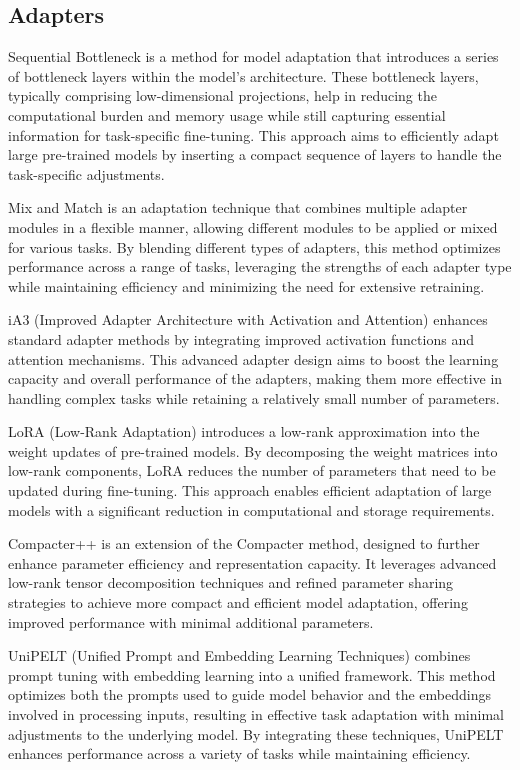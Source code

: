 \documentclass[10pt,twocolumn,letterpaper]{article}
\begin{document}
\subsection{Adapters}
Sequential Bottleneck is a method for model adaptation that introduces a series of bottleneck layers within the model’s architecture. These bottleneck layers, typically comprising low-dimensional projections, help in reducing the computational burden and memory usage while still capturing essential information for task-specific fine-tuning. This approach aims to efficiently adapt large pre-trained models by inserting a compact sequence of layers to handle the task-specific adjustments.

Mix and Match is an adaptation technique that combines multiple adapter modules in a flexible manner, allowing different modules to be applied or mixed for various tasks. By blending different types of adapters, this method optimizes performance across a range of tasks, leveraging the strengths of each adapter type while maintaining efficiency and minimizing the need for extensive retraining.

iA3 (Improved Adapter Architecture with Activation and Attention) enhances standard adapter methods by integrating improved activation functions and attention mechanisms. This advanced adapter design aims to boost the learning capacity and overall performance of the adapters, making them more effective in handling complex tasks while retaining a relatively small number of parameters.

LoRA (Low-Rank Adaptation) introduces a low-rank approximation into the weight updates of pre-trained models. By decomposing the weight matrices into low-rank components, LoRA reduces the number of parameters that need to be updated during fine-tuning. This approach enables efficient adaptation of large models with a significant reduction in computational and storage requirements.

Compacter++ is an extension of the Compacter method, designed to further enhance parameter efficiency and representation capacity. It leverages advanced low-rank tensor decomposition techniques and refined parameter sharing strategies to achieve more compact and efficient model adaptation, offering improved performance with minimal additional parameters.

UniPELT (Unified Prompt and Embedding Learning Techniques) combines prompt tuning with embedding learning into a unified framework. This method optimizes both the prompts used to guide model behavior and the embeddings involved in processing inputs, resulting in effective task adaptation with minimal adjustments to the underlying model. By integrating these techniques, UniPELT enhances performance across a variety of tasks while maintaining efficiency.
\end{document}
